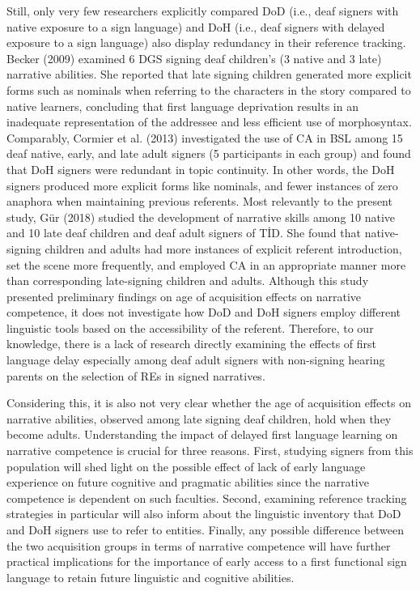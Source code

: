 \documentclass[]{elsarticle} %
\begin{document}
Still, only very few researchers explicitly compared DoD (i.e., deaf
signers with native exposure to a sign language) and DoH (i.e., deaf
signers with delayed exposure to a sign language) also display
redundancy in their reference tracking. Becker (2009) examined 6 DGS
signing deaf children's (3 native and 3 late) narrative abilities. She
reported that late signing children generated more explicit forms such
as nominals when referring to the characters in the story compared to
native learners, concluding that first language deprivation results in
an inadequate representation of the addressee and less efficient use of
morphosyntax. Comparably, Cormier et al. (2013) investigated the use of
CA in BSL among 15 deaf native, early, and late adult signers (5
participants in each group) and found that DoH signers were redundant in
topic continuity. In other words, the DoH signers produced more explicit
forms like nominals, and fewer instances of zero anaphora when
maintaining previous referents. Most relevantly to the present study,
Gür (2018) studied the development of narrative skills among 10 native
and 10 late deaf children and deaf adult signers of TİD. She found that
native-signing children and adults had more instances of explicit
referent introduction, set the scene more frequently, and employed CA in
an appropriate manner more than corresponding late-signing children and
adults. Although this study presented preliminary findings on age of
acquisition effects on narrative competence, it does not investigate how
DoD and DoH signers employ different linguistic tools based on the
accessibility of the referent. Therefore, to our knowledge, there is a
lack of research directly examining the effects of first language delay
especially among deaf adult signers with non-signing hearing parents on
the selection of REs in signed narratives.

Considering this, it is also not very clear whether the age of
acquisition effects on narrative abilities, observed among late signing
deaf children, hold when they become adults. Understanding the impact of
delayed first language learning on narrative competence is crucial for
three reasons. First, studying signers from this population will shed
light on the possible effect of lack of early language experience on
future cognitive and pragmatic abilities since the narrative competence
is dependent on such faculties. Second, examining reference tracking
strategies in particular will also inform about the linguistic inventory
that DoD and DoH signers use to refer to entities. Finally, any possible
difference between the two acquisition groups in terms of narrative
competence will have further practical implications for the importance
of early access to a first functional sign language to retain future
linguistic and cognitive abilities.
\end{document}
